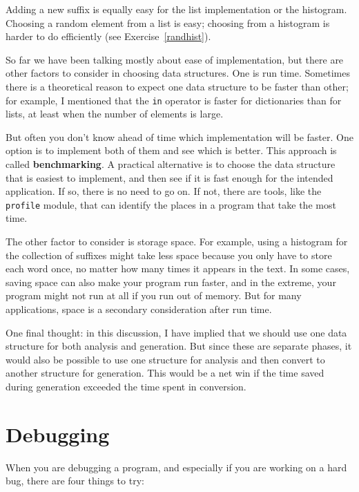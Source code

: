\documentclass[10pt]{book}
\begin{document}
{Adding a new suffix is equally easy for the list implementation
or the histogram.  Choosing a random element from a list
is easy; choosing from a histogram is harder to do
efficiently (see Exercise~\ref{randhist}).

So far we have been talking mostly about ease of implementation,
but there are other factors to consider in choosing data structures.
One is run time.  Sometimes there is a theoretical reason to expect
one data structure to be faster than other; for example, I mentioned
that the {\tt in} operator is faster for dictionaries than for lists,
at least when the number of elements is large.

But often you don't know ahead of time which implementation will
be faster.  One option is to implement both of them and see which
is better.  This approach is called {\bf benchmarking}.  A practical
alternative is to choose the data structure that is
easiest to implement, and then see if it is fast enough for the
intended application.  If so, there is no need to go on.  If not,
there are tools, like the {\tt profile} module, that can identify
the places in a program that take the most time.


The other factor to consider is storage space.  For example, using a
histogram for the collection of suffixes might take less space because
you only have to store each word once, no matter how many times it
appears in the text.  In some cases, saving space can also make your
program run faster, and in the extreme, your program might not run at
all if you run out of memory.  But for many applications, space is a
secondary consideration after run time.

One final thought: in this discussion, I have implied that
we should use one data structure for both analysis and generation.  But
since these are separate phases, it would also be possible to use one
structure for analysis and then convert to another structure for
generation.  This would be a net win if the time saved during
generation exceeded the time spent in conversion.


\section{Debugging}

When you are debugging a program, and especially if you are
working on a hard bug, there are four things to try:

}
\end{document}
